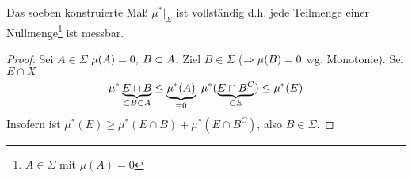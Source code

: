 \documentclass[skript.tex]{subfiles}
\begin{document}
	\begin{bem}
		Das soeben konstruierte Maß $\mu^*|_\Sigma$ ist vollständig d.h. jede Teilmenge einer Nullmenge\footnote{$A\in\Sigma$ mit $ \mu(A)=0$} ist messbar.
	\end{bem}

	\begin{proof}
		Sei $A\in\Sigma$ $\mu(A)=0, \: B\subset A$. Ziel $B\in\Sigma$ ($\Rightarrow \mu(B)=0$ wg. Monotonie). Sei $E\cap X$
		\begin{equation*}
			\mu^*\underbrace{E\cap B}_{\subset B\subset A}\leq\underbrace{\mu^*(A)}_{=0}\ \mu^*(\underbrace{E\cap B^C}_{\subset E})\leq\mu^*(E)
		\end{equation*}
		Insofern ist $\mu^*(E)\geq\mu^*(E\cap B)+\mu^*(E\cap B^C)$, also $B\in\Sigma$.
	\end{proof}
\end{document}
